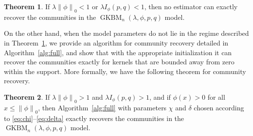 \documentclass[letterpaper,11pt]{article}
\newtheorem{thm}{Theorem}[section]
\theoremstyle{definition}
\newcommand{\zeronorm}[1]{{\lVert#1\rVert}_0}
\numberwithin{equation}{section}
\newcommand{\GKBM}{\operatorname{GKBM}}
\newcommand{\la}{\lambda}
\newtheorem{thm}{Theorem}[section]
\theoremstyle{definition}
\newcommand{\zeronorm}[1]{{\lVert#1\rVert}_0}
\numberwithin{equation}{section}
\newcommand{\GKBM}{\operatorname{GKBM}}
\newcommand{\la}{\lambda}
\theoremstyle{thmstyletwo}%
\begin{document}
\begin{thm}
\label{thm:impossibility}
If $\la \zeronorm{\phi} < 1$ or $\la I_\phi(p,q) < 1$,
then no estimator can exactly recover the communities
in the $\GKBM_n(\la, \phi, p, q)$ model.
\end{thm}


On the other hand, when the model parameters do not lie in the regime described in Theorem~\ref{thm:impossibility}, we provide an algorithm for community recovery detailed in Algorithm~\ref{alg:full}, and show that with the appropriate initialization it can recover the communities exactly for kernels that are bounded away from zero within the support. More formally, we have the following theorem for community recovery.

\begin{thm}
\label{thm:exact_recovery}
If $\la \zeronorm{\phi} > 1$ and $\la I_\phi(p,q) > 1$,
and if $\phi(x) > 0$ for all $x \le \zeronorm{\phi}$,
then
Algorithm~\ref{alg:full}
with parameters $\chi$ and $\delta$ chosen according to \eqref{eq:chi}--\eqref{eq:delta}
exactly recovers the communities in the $\GKBM_n(\la, \phi, p, q)$ model.
\end{thm}
\end{document}
